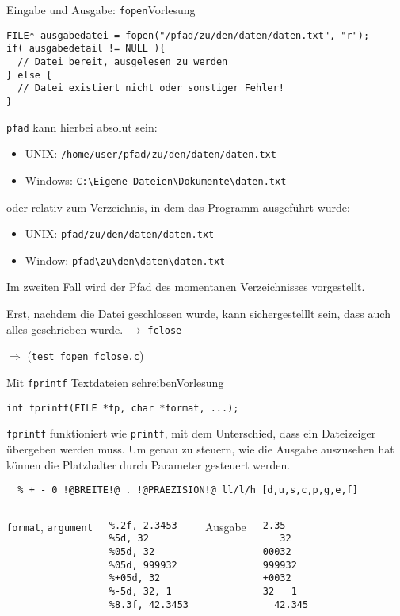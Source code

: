 \documentclass[xcolor=dvipsnames]{beamer}
\newcounter{lecturecounter}
\begin{document}
\begin{frame}[fragile]{Eingabe und Ausgabe: \texttt{fopen}}{Vorlesung }
\begin{lstlisting}
FILE* ausgabedatei = fopen("/pfad/zu/den/daten/daten.txt", "r");
if( ausgabedetail != NULL ){
  // Datei bereit, ausgelesen zu werden
} else {
  // Datei existiert nicht oder sonstiger Fehler!
}
\end{lstlisting}
\vspace{-0.2cm}
\begin{block}{}
  \footnotesize
  \verb|pfad| kann hierbei absolut sein:
  \begin{itemize}
    \item{UNIX:    \verb|/home/user/pfad/zu/den/daten/daten.txt|}
    \item{Windows: \verb|C:\Eigene Dateien\Dokumente\daten.txt|}
  \end{itemize}
  oder relativ zum Verzeichnis, in dem das Programm ausgeführt wurde:
  \begin{itemize}
    \item{UNIX:    \verb|pfad/zu/den/daten/daten.txt|}
    \item{Window:  \verb|pfad\zu\den\daten\daten.txt|}
  \end{itemize}
  Im zweiten Fall wird der Pfad des momentanen Verzeichnisses vorgestellt.
\end{block}
\begin{block}{}
  \footnotesize
  Erst, nachdem die Datei geschlossen wurde, kann sichergestelllt sein, dass auch alles geschrieben wurde. $\rightarrow$ \texttt{fclose}
\end{block}
$\Rightarrow$ (\verb|test_fopen_fclose.c|)
\end{frame}

\begin{frame}[fragile]{Mit \texttt{fprintf} Textdateien schreiben}{Vorlesung }
\begin{lstlisting}
int fprintf(FILE *fp, char *format, ...);
\end{lstlisting}
\begin{block}{}
  \texttt{fprintf} funktioniert wie \texttt{printf}, mit dem Unterschied, dass ein Dateizeiger übergeben werden muss. Um genau zu steuern, wie die Ausgabe auszusehen hat können die Platzhalter durch Parameter gesteuert werden.
\end{block}
\begin{lstlisting}
  % + - 0 !@BREITE!@ . !@PRAEZISION!@ ll/l/h [d,u,s,c,p,g,e,f]  
\end{lstlisting}
\begin{columns}
\texttt{format}, \texttt{argument} 
\begin{lstlisting}
%.2f, 2.3453
%5d, 32
%05d, 32
%05d, 999932
%+05d, 32
%-5d, 32, 1
%8.3f, 42.3453
\end{lstlisting}
Ausgabe
\begin{lstlisting}
2.35
   32
00032
999932
+0032
32   1
  42.345
\end{lstlisting}
\end{columns}
\end{frame}
\end{document}
